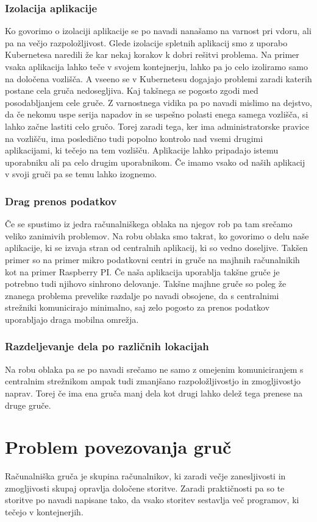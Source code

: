 \documentclass[a4paper, 12pt]{book}
\begin{document}
\subsection{Izolacija aplikacije}
Ko govorimo o izolaciji aplikacije se po navadi nanašamo na varnost pri vdoru, ali pa na večjo razpoložljivost.
Glede izolacije spletnih aplikacij smo z uporabo Kubernetesa naredili že kar nekaj korakov k dobri rešitvi problema.
Na primer vsaka aplikacija lahko teče v svojem kontejnerju, lahko pa jo celo izoliramo samo na določena vozlišča.
A vseeno se v Kubernetesu dogajajo problemi zaradi katerih postane cela gruča nedosegljiva.
Kaj takšnega se pogosto zgodi med posodabljanjem cele gruče.
Z varnostnega vidika pa po navadi mislimo na dejstvo, da če nekomu uspe serija napadov in se uspešno polasti enega samega vozlišča, si lahko začne lastiti celo gručo.
Torej zaradi tega, ker ima administratorske pravice na vozlišču, ima posledično tudi popolno kontrolo nad vsemi drugimi aplikacijami, ki tečejo na tem vozlišču.
Aplikacije lahko pripadajo istemu uporabniku ali pa celo drugim uporabnikom.
Če imamo vsako od naših aplikacij v svoji gruči pa se temu lahko izognemo.
\subsection{Drag prenos podatkov}
Če se spustimo iz jedra računalniškega oblaka na njegov rob pa tam srečamo veliko zanimivih problemov. 
Na robu oblaka smo takrat, ko govorimo o delu naše aplikacije, ki se izvaja stran od centralnih aplikacij, ki so vedno doseljive.
Takšen primer so na primer mikro podatkovni centri in gruče na majhnih računalnikih kot na primer Raspberry PI.
Če naša aplikacija uporablja takšne gruče je potrebno tudi njihovo sinhrono delovanje.
Takšne majhne gruče so poleg že znanega problema prevelike razdalje po navadi obsojene, da s centralnimi strežniki komunicirajo minimalno, saj zelo pogosto za prenos podatkov uporabljajo draga mobilna omrežja.
\subsection{Razdeljevanje dela po različnih lokacijah}
Na robu oblaka pa se po navadi srečamo ne samo z omejenim komuniciranjem s centralnim strežnikom ampak tudi zmanjšano razpoložljivostjo in zmogljivostjo naprav.
Torej če ima ena gruča manj dela kot drugi lahko delež tega prenese na druge gruče.
\chapter{Problem povezovanja gruč}
Računalniška gruča je skupina računalnikov, ki zaradi večje zanesljivosti in zmogljivosti skupaj opravlja določene storitve.
Zaradi praktičnosti pa so te storitve po navadi napisane tako, da vsako storitev sestavlja več programov, ki tečejo v kontejnerjih.
\end{document}
